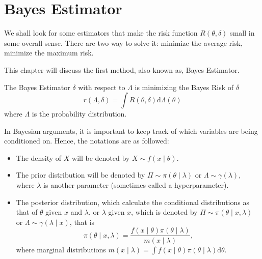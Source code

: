 \chapter{Bayes Estimator}

We shall look for some estimators that make the risk function $R\left(\theta,\delta\right)$ small in some overall sense. There are two way to solve it: minimize the average risk, minimize the maximum risk.

This chapter will discuss the first method, also known as, Bayes Estimator.

\begin{definition} \label{def:bayes-estimator}
    The Bayes Estimator $\delta$ with respect to $\Lambda$ is minimizing the Bayes Risk of $\delta$
    \begin{equation}
        r\left(\Lambda, \delta\right)=\int R\left(\theta, \delta\right) \mathrm{d} \Lambda\left(\theta\right)
    \end{equation}
    where $\Lambda$ is the probability distribution.
\end{definition}

In Bayesian arguments, it is important to keep track of which variables are being conditioned on. Hence, the notations are as followed:
\begin{itemize}
    \item The density of $X$ will be denoted by $X \sim f\left(x \mid \theta\right)$.
    \item The prior distribution will be denoted by $\Pi \sim \pi\left(\theta \mid \lambda\right)$ or $\Lambda \sim \gamma\left(\lambda\right)$, where $\lambda$ is another parameter (sometimes called a hyperparameter).
    \item The posterior distribution, which calculate the conditional distributions as that of $\theta$ given $x$ and $\lambda$, or $\lambda$ given $x$, which is denoted by $\Pi \sim \pi\left(\theta \mid x, \lambda\right)$ or $\Lambda \sim \gamma\left(\lambda \mid x\right)$, that is
          \begin{equation}
              \pi\left(\theta \mid x, \lambda\right) = \frac{f\left(x \mid \theta\right) \pi\left(\theta \mid \lambda\right)}{m\left(x \mid \lambda\right)},
          \end{equation}
          where marginal distributions $m\left(x \mid \lambda\right) = \int f\left(x \mid \theta\right) \pi\left(\theta \mid \lambda\right) \mathrm{d} \theta$.
\end{itemize}

